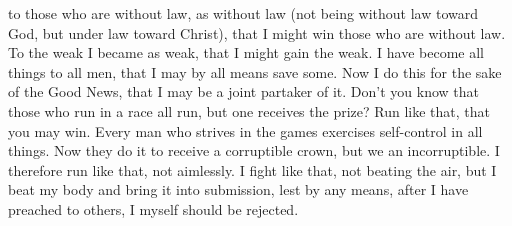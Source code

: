 {to those who are without law, as without law (not being without law toward God, but under law toward Christ), that I might win those who are without law.
To the weak I became as weak, that I might gain the weak. I have become all things to all men, that I may by all means save some.
Now I do this for the sake of the Good News, that I may be a joint partaker of it.
Don’t you know that those who run in a race all run, but one receives the prize? Run like that, that you may win.
Every man who strives in the games exercises self-control in all things. Now they do it to receive a corruptible crown, but we an incorruptible.
I therefore run like that, not aimlessly. I fight like that, not beating the air,
but I beat my body and bring it into submission, lest by any means, after I have preached to others, I myself should be rejected.

}
